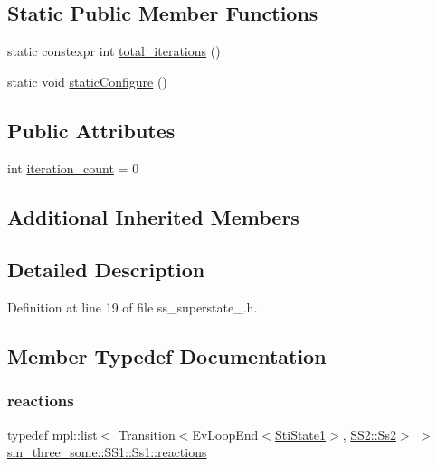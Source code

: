 \subsection*{Static Public Member Functions}
\begin{DoxyCompactItemize}
\item 
static constexpr int \hyperlink{structsm__three__some_1_1SS1_1_1Ss1_a02f44c29d4ebf2615b66a0783ee668e4}{total\+\_\+iterations} ()
\item 
static void \hyperlink{structsm__three__some_1_1SS1_1_1Ss1_a2697925f1d03b131fb253bf12d7bca08}{static\+Configure} ()
\end{DoxyCompactItemize}
\subsection*{Public Attributes}
\begin{DoxyCompactItemize}
\item 
int \hyperlink{structsm__three__some_1_1SS1_1_1Ss1_a775d2050e53513d711b041238b5c11ff}{iteration\+\_\+count} = 0
\end{DoxyCompactItemize}
\subsection*{Additional Inherited Members}


\subsection{Detailed Description}


Definition at line 19 of file ss\+\_\+superstate\+\_.\+h.



\subsection{Member Typedef Documentation}
\mbox{\label{structsm__three__some_1_1SS1_1_1Ss1_af609dca860303e5a4b4913bed8b71bed}} 
\subsubsection{\texorpdfstring{reactions}{reactions}}
{\footnotesize\ttfamily typedef mpl\+::list$<$ Transition$<$Ev\+Loop\+End$<$\hyperlink{structsm__three__some_1_1inner__states_1_1StiState1}{Sti\+State1}$>$, \hyperlink{structsm__three__some_1_1SS2_1_1Ss2}{S\+S2\+::\+Ss2}$>$ $>$ \hyperlink{structsm__three__some_1_1SS1_1_1Ss1_af609dca860303e5a4b4913bed8b71bed}{sm\+\_\+three\+\_\+some\+::\+S\+S1\+::\+Ss1\+::reactions}}



